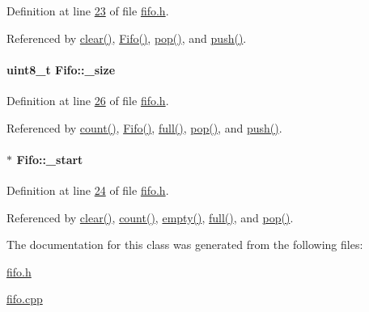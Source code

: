 Definition at line \hyperlink{fifo_8h_source_l00023}{23} of file \hyperlink{fifo_8h_source}{fifo.h}.



Referenced by \hyperlink{fifo_8cpp_source_l00022}{clear()}, \hyperlink{fifo_8cpp_source_l00014}{Fifo()}, \hyperlink{fifo_8cpp_source_l00092}{pop()}, and \hyperlink{fifo_8cpp_source_l00074}{push()}.

\hypertarget{class_fifo_a0eb7824d54929e385223ef2e32c45c91}{
\paragraph[{\_\-size}]{\setlength{\rightskip}{0pt plus 5cm}uint8\_\-t {\bf Fifo::\_\-size}}\hfill}
\label{class_fifo_a0eb7824d54929e385223ef2e32c45c91}


Definition at line \hyperlink{fifo_8h_source_l00026}{26} of file \hyperlink{fifo_8h_source}{fifo.h}.



Referenced by \hyperlink{fifo_8cpp_source_l00050}{count()}, \hyperlink{fifo_8cpp_source_l00014}{Fifo()}, \hyperlink{fifo_8cpp_source_l00060}{full()}, \hyperlink{fifo_8cpp_source_l00092}{pop()}, and \hyperlink{fifo_8cpp_source_l00074}{push()}.

\hypertarget{class_fifo_a440e9cfd5fd73a4f571a4027ff74d8d2}{
\paragraph[{\_\-start}]{$\ast$ {\bf Fifo::\_\-start}}\hfill}
\label{class_fifo_a440e9cfd5fd73a4f571a4027ff74d8d2}


Definition at line \hyperlink{fifo_8h_source_l00024}{24} of file \hyperlink{fifo_8h_source}{fifo.h}.



Referenced by \hyperlink{fifo_8cpp_source_l00022}{clear()}, \hyperlink{fifo_8cpp_source_l00050}{count()}, \hyperlink{fifo_8cpp_source_l00066}{empty()}, \hyperlink{fifo_8cpp_source_l00060}{full()}, and \hyperlink{fifo_8cpp_source_l00092}{pop()}.



The documentation for this class was generated from the following files:\begin{DoxyCompactItemize}
\item 
\hyperlink{fifo_8h}{fifo.h}\item 
\hyperlink{fifo_8cpp}{fifo.cpp}\end{DoxyCompactItemize}
